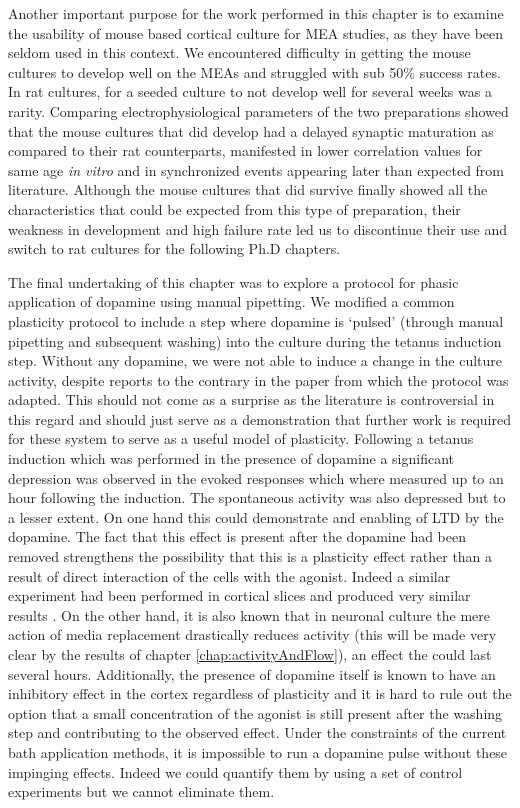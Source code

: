     Another important purpose for the work performed in this chapter is to examine the usability of mouse based cortical culture for MEA studies, as they have been seldom used in this context. We encountered difficulty in getting the mouse cultures to develop well on the MEAs and struggled with sub 50\% success rates. In rat cultures, for a seeded culture to not develop well for several weeks was a rarity. Comparing  electrophysiological parameters of the two preparations showed that the mouse cultures that did develop had a delayed synaptic maturation as compared to their rat counterparts, manifested in lower correlation values for same age \textit{in vitro} and in synchronized events appearing later than expected from literature. Although the mouse cultures that did survive finally showed all the characteristics that could be expected from this type of preparation, their weakness in development and high failure rate led us to discontinue their use and switch to rat cultures for the following Ph.D chapters.

    The final undertaking of this chapter was to explore a protocol for phasic application of dopamine using manual pipetting. We modified a common plasticity protocol to include a step where dopamine is `pulsed' (through manual pipetting and subsequent washing) into the culture during the tetanus induction step. Without any dopamine, we were not able to induce a change in the culture activity, despite reports to the contrary in the paper from which the protocol was adapted. This should not come as a surprise as the literature is controversial in this regard and should just serve as a demonstration that further work is required for these system to serve as a useful model of plasticity. Following a tetanus induction which was performed in the presence of dopamine a significant depression was observed in the evoked responses which where measured up to an hour following the induction. The spontaneous activity was also depressed but to a lesser extent. On one hand this could demonstrate and enabling of LTD by the dopamine. The fact that this effect is present after the dopamine had been removed strengthens the possibility that this is a plasticity effect rather than a result of direct interaction of the cells with the agonist. Indeed a similar experiment had been performed in cortical slices and produced very similar results \cite{otani1998dopamine}. On the other hand, it is also known that in neuronal culture the mere action of media replacement drastically reduces activity (this  will be made very clear by the results of chapter \ref{chap:activityAndFlow}), an effect the could last several hours. Additionally, the presence of dopamine itself is known to have an inhibitory effect in the cortex regardless of plasticity \cite{gu2002neuromodulatory,gonzalez2001dopamine} and it is hard to rule out the option that a small concentration of the agonist is still present after the washing step and contributing to the observed effect. Under the constraints of the current bath application methods, it is impossible to run a dopamine pulse without these impinging effects. Indeed we could quantify them by using a set of control experiments but we cannot eliminate them.

